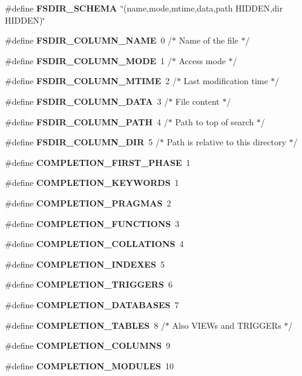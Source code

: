\begin{DoxyCompactItemize}
\item 
\#define \textbf{ F\+S\+D\+I\+R\+\_\+\+S\+C\+H\+E\+MA}~\char`\"{}(name,mode,mtime,data,path H\+I\+D\+D\+EN,dir H\+I\+D\+D\+EN)\char`\"{}
\item 
\#define \textbf{ F\+S\+D\+I\+R\+\_\+\+C\+O\+L\+U\+M\+N\+\_\+\+N\+A\+ME}~0     /$\ast$ Name of the file $\ast$/
\item 
\#define \textbf{ F\+S\+D\+I\+R\+\_\+\+C\+O\+L\+U\+M\+N\+\_\+\+M\+O\+DE}~1     /$\ast$ Access mode $\ast$/
\item 
\#define \textbf{ F\+S\+D\+I\+R\+\_\+\+C\+O\+L\+U\+M\+N\+\_\+\+M\+T\+I\+ME}~2     /$\ast$ Last modification time $\ast$/
\item 
\#define \textbf{ F\+S\+D\+I\+R\+\_\+\+C\+O\+L\+U\+M\+N\+\_\+\+D\+A\+TA}~3     /$\ast$ File content $\ast$/
\item 
\#define \textbf{ F\+S\+D\+I\+R\+\_\+\+C\+O\+L\+U\+M\+N\+\_\+\+P\+A\+TH}~4     /$\ast$ Path to top of search $\ast$/
\item 
\#define \textbf{ F\+S\+D\+I\+R\+\_\+\+C\+O\+L\+U\+M\+N\+\_\+\+D\+IR}~5     /$\ast$ Path is relative to this directory $\ast$/
\item 
\#define \textbf{ C\+O\+M\+P\+L\+E\+T\+I\+O\+N\+\_\+\+F\+I\+R\+S\+T\+\_\+\+P\+H\+A\+SE}~1
\item 
\#define \textbf{ C\+O\+M\+P\+L\+E\+T\+I\+O\+N\+\_\+\+K\+E\+Y\+W\+O\+R\+DS}~1
\item 
\#define \textbf{ C\+O\+M\+P\+L\+E\+T\+I\+O\+N\+\_\+\+P\+R\+A\+G\+M\+AS}~2
\item 
\#define \textbf{ C\+O\+M\+P\+L\+E\+T\+I\+O\+N\+\_\+\+F\+U\+N\+C\+T\+I\+O\+NS}~3
\item 
\#define \textbf{ C\+O\+M\+P\+L\+E\+T\+I\+O\+N\+\_\+\+C\+O\+L\+L\+A\+T\+I\+O\+NS}~4
\item 
\#define \textbf{ C\+O\+M\+P\+L\+E\+T\+I\+O\+N\+\_\+\+I\+N\+D\+E\+X\+ES}~5
\item 
\#define \textbf{ C\+O\+M\+P\+L\+E\+T\+I\+O\+N\+\_\+\+T\+R\+I\+G\+G\+E\+RS}~6
\item 
\#define \textbf{ C\+O\+M\+P\+L\+E\+T\+I\+O\+N\+\_\+\+D\+A\+T\+A\+B\+A\+S\+ES}~7
\item 
\#define \textbf{ C\+O\+M\+P\+L\+E\+T\+I\+O\+N\+\_\+\+T\+A\+B\+L\+ES}~8    /$\ast$ Also V\+I\+E\+Ws and T\+R\+I\+G\+G\+E\+Rs $\ast$/
\item 
\#define \textbf{ C\+O\+M\+P\+L\+E\+T\+I\+O\+N\+\_\+\+C\+O\+L\+U\+M\+NS}~9
\item 
\#define \textbf{ C\+O\+M\+P\+L\+E\+T\+I\+O\+N\+\_\+\+M\+O\+D\+U\+L\+ES}~10

\end{DoxyCompactItemize}
